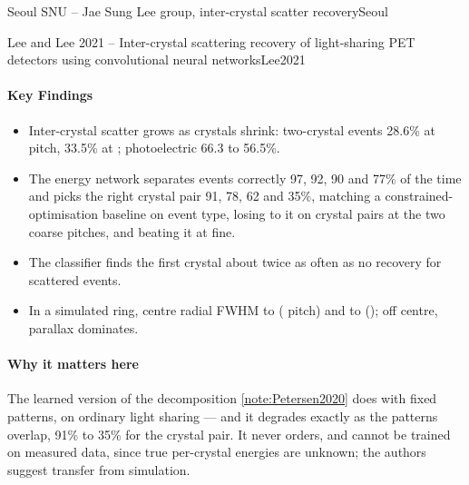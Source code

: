 \begin{programnote}{Seoul SNU -- Jae Sung Lee group, inter-crystal scatter recovery}{Seoul}
\begin{papernote}{Lee and Lee 2021 -- Inter-crystal scattering recovery of light-sharing PET detectors using convolutional neural networks}{Lee2021}
\paragraph{Key Findings}
\begin{itemize}
	\item Inter-crystal scatter grows as crystals shrink: two-crystal events
		28.6\% at  pitch, 33.5\% at ; photoelectric
		66.3 to 56.5\%.
	\item The energy network separates events correctly 97, 92, 90 and 77\%
		of the time and picks the right crystal pair 91, 78, 62 and 35\%,
		matching a constrained-optimisation baseline on event type, losing to it
		on crystal pairs at the two coarse pitches, and beating it at fine.
	\item The classifier finds the first crystal about twice as often as no
		recovery for scattered events.
	\item In a simulated ring, centre radial FWHM  to 
		( pitch) and  to  (); off centre,
		parallax dominates.
\end{itemize}

\paragraph{Why it matters here}
The learned version of the decomposition \ref{note:Petersen2020} does with
fixed patterns, on ordinary light sharing --- and it degrades exactly as the
patterns overlap, 91\% to 35\% for the crystal pair. It never orders, and
cannot be trained on measured data, since true per-crystal energies are
unknown; the authors suggest transfer from simulation.
\end{papernote}

\end{programnote}


